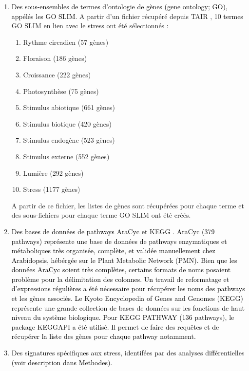 \documentclass[twoside]{article}
\newcommand{\AR}[1]{\textcolor{black}{#1}}
\begin{document}
   \begin{enumerate}
   \vspace{0.2cm}
       \item \AR{Des sous-ensembles de termes d'ontologie de gènes (gene ontology; GO), appélés les GO SLIM}. A partir d'un fichier récupéré depuis TAIR \cite{huala_arabidopsis_2001}, 10 \AR{termes} GO SLIM \AR{en lien avec le stress} ont été sélectionnés : 
       
       \begin{enumerate}
           \item Rythme circadien (57 gènes)
           \item Floraison (186 gènes)
           \item Croissance (222 gènes)
           \item Photosynthèse (75 gènes)
            \item Stimulus abiotique (661 gènes)
            \item Stimulus biotique (420 gènes)
            \item Stimulus endogène (523 gènes)
            \item Stimulus externe (552 gènes)
            \item Lumière (292 gènes)
            \item Stress (1177 gènes)
       \end{enumerate}


A partir de ce fichier, les listes de gènes sont récupérées pour chaque terme et des sous-fichiers pour chaque terme GO SLIM ont été créés.
       \item \vspace{0.5cm}\AR{Des bases de données de pathways AraCyc \cite{mueller_aracyc_2003} et KEGG \cite{kanehisa_kegg_2000}. AraCyc (379 pathways) représente une base de données de pathways enzymatiques et métaboliques très organisée, complète, et validée manuellement chez Arabidopsis, hébérgée sur le Plant Metabolic Network (PMN). Bien que les données AraCyc soient très complètes, certains formats de noms posaient problème pour la délimitation des colonnes. Un travail de reformatage et d'expressions régulières a été nécessaire pour récupérer les noms des pathways et les gènes associés. Le Kyoto Encyclopedia of Genes and Genomes (KEGG) représente une grande collection de bases de données sur les fonctions de haut niveau du système biologique. Pour KEGG PATHWAY (136 pathways), le package KEGGAPI a été utilisé. Il permet de faire des requêtes et de récupérer la liste des gènes pour chaque pathway notamment.}
       \item \vspace{0.5cm}\AR{Des signatures spécifiques aux stress, identifées par des analyses différentielles (voir description dans Methodes).}
   \end{enumerate}
    
\end{document}
